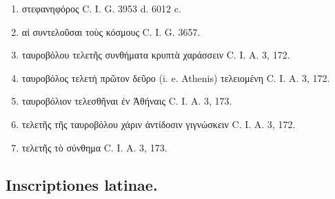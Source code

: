 \documentclass[a4paper, 11pt, oneside, polutonikogreek, german]{article}
\begin{document}
\begin{enumerate}
\item στεφανηφόρος C. I. G. 3953 d. 6012 c.

\item αἱ συντελοῦσαι τοὺς κόσμους C. I. G. 3657.

\item ταυροβόλου τελετῆς συνθήματα κρυπτὰ χαράσσειν C. I. A. 3, 172.

\item ταυροβόλος τελετὴ πρῶτον δεῦρο (i. e. Athenis) τελειομένη C. I. A. 3, 172.

\item ταυροβόλιον τελεσθῆναι ἐν Ἀθήναις C. I. A. 3, 173.

\item τελετῆς τῆς ταυροβόλου χάριν ἀντίδοσιν γιγνώσκειν C. I. A. 3, 172.

\item τελετῆς τὸ σύνθημα C. I. A. 3, 173.
\end{enumerate}
\subsection{Inscriptiones latinae.}
\end{document}
